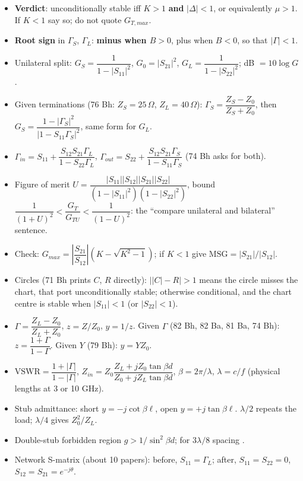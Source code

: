\begin{itemize}[leftmargin=12pt, itemsep=0.5pt, topsep=1pt]
  \item \textbf{Verdict}: unconditionally stable iff $K > 1$ \textbf{and} $|\Delta| < 1$,
    or equivalently $\mu > 1$. If $K < 1$ say so; do not quote $G_{T,max}$.
  \item \textbf{Root sign} in $\Gamma_S$, $\Gamma_L$: \textbf{minus when $B > 0$}, plus when
    $B < 0$, so that $|\Gamma| < 1$.
  \item Unilateral split: $G_S = \dfrac{1}{1-|S_{11}|^2}$, $G_0 = |S_{21}|^2$,
    $G_L = \dfrac{1}{1-|S_{22}|^2}$; dB $= 10\log G$.
  \item Given terminations (76 Bh: $Z_S = 25\,\Omega$, $Z_L = 40\,\Omega$):
    $\Gamma_S = \dfrac{Z_S - Z_0}{Z_S + Z_0}$, then
    $G_S = \dfrac{1-|\Gamma_S|^2}{|1-S_{11}\Gamma_S|^2}$, same form for $G_L$.
  \item $\Gamma_{in} = S_{11} + \dfrac{S_{12}S_{21}\Gamma_L}{1 - S_{22}\Gamma_L}$,
    $\Gamma_{out} = S_{22} + \dfrac{S_{12}S_{21}\Gamma_S}{1 - S_{11}\Gamma_S}$
    (74 Bh asks for both).
  \item Figure of merit $U = \dfrac{|S_{11}||S_{12}||S_{21}||S_{22}|}{(1-|S_{11}|^2)(1-|S_{22}|^2)}$,
    bound $\dfrac{1}{(1+U)^2} < \dfrac{G_T}{G_{TU}} < \dfrac{1}{(1-U)^2}$: the ``compare
    unilateral and bilateral'' sentence.
  \item Check: $G_{max} = \left|\dfrac{S_{21}}{S_{12}}\right|\left(K - \sqrt{K^2-1}\right)$;
    if $K < 1$ give $\mathrm{MSG} = |S_{21}|/|S_{12}|$.
  \item Circles (71 Bh prints $C$, $R$ directly): $\big||C| - R\big| > 1$ means the circle
    misses the chart, that port unconditionally stable; otherwise conditional, and the chart
    centre is stable when $|S_{11}| < 1$ (or $|S_{22}| < 1$).
\end{itemize}

\begin{itemize}[leftmargin=12pt, itemsep=0.5pt, topsep=1pt]
  \item $\Gamma = \dfrac{Z_L - Z_0}{Z_L + Z_0}$, $z = Z/Z_0$, $y = 1/z$. Given $\Gamma$
    (82 Bh, 82 Ba, 81 Ba, 74 Bh): $z = \dfrac{1+\Gamma}{1-\Gamma}$. Given $Y$ (79 Bh):
    $y = YZ_0$.
  \item $\mathrm{VSWR} = \dfrac{1+|\Gamma|}{1-|\Gamma|}$,
    $Z_{in} = Z_0\dfrac{Z_L + jZ_0\tan\beta d}{Z_0 + jZ_L\tan\beta d}$, $\beta = 2\pi/\lambda$,
    $\lambda = c/f$ (physical lengths at 3 or 10 GHz).
  \item Stub admittance: short $y = -j\cot\beta\ell$, open $y = +j\tan\beta\ell$.
    $\lambda/2$ repeats the load; $\lambda/4$ gives $Z_0^2/Z_L$.
  \item Double-stub forbidden region $g > 1/\sin^2\beta d$; for $3\lambda/8$ spacing
    .
  \item Network S-matrix (about 10 papers): before, $S_{11} = \Gamma_L$; after,
    $S_{11} = S_{22} = 0$, $S_{12} = S_{21} = e^{-j\theta}$.
\end{itemize}

